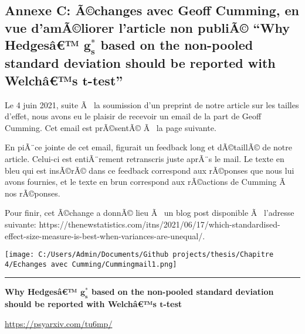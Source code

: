 \begin{appendix}
\newpage

\hypertarget{annexe-c-uxe3changes-avec-geoff-cumming-en-vue-damuxe3liorer-larticle-non-publiuxe3-why-hedgesuxe2-bmg_s-based-on-the-non-pooled-standard-deviation-should-be-reported-with-welchuxe2s-bmt-test}{%
\subsection{\texorpdfstring{Annexe C: Ã©changes avec Geoff Cumming, en
vue d'amÃ©liorer l'article non publiÃ© ``Why Hedgesâ€™ \(\bm{g_s^*}\)
based on the non-pooled standard deviation should be reported with
Welchâ€™s
\(\bm{t}\)-test''}{Annexe C: Ã©changes avec Geoff Cumming, en vue d'amÃ©liorer l'article non publiÃ© ``Why Hedgesâ€™ \textbackslash bm\{g\_s\^{}*\} based on the non-pooled standard deviation should be reported with Welchâ€™s \textbackslash bm\{t\}-test''}}\label{annexe-c-uxe3changes-avec-geoff-cumming-en-vue-damuxe3liorer-larticle-non-publiuxe3-why-hedgesuxe2-bmg_s-based-on-the-non-pooled-standard-deviation-should-be-reported-with-welchuxe2s-bmt-test}}

Le 4 juin 2021, suite Ã~ la soumission d'un preprint de notre article
sur les tailles d'effet, nous avons eu le plaisir de recevoir un email
de la part de Geoff Cumming. Cet email est prÃ©sentÃ© Ã~ la page
suivante.

En piÃ¨ce jointe de cet email, figurait un feedback long et dÃ©taillÃ©
de notre article. Celui-ci est entiÃ¨rement retranscris juste aprÃ¨s le
mail. Le texte en bleu qui est insÃ©rÃ© dans ce feedback correspond aux
rÃ©ponses que nous lui avons fournies, et le texte en brun correspond
aux rÃ©actions de Cumming Ã~ nos rÃ©ponses.

Pour finir, cet Ã©change a donnÃ© lieu Ã~ un blog post disponible Ã~
l'adresse suivante:
https://thenewstatistics.com/itns/2021/06/17/which-standardised-effect-size-measure-is-best-when-variances-are-unequal/.

\texttt{[image: C:/Users/Admin/Documents/Github projects/thesis/Chapitre 4/Echanges avec Cumming/Cummingmail1.png]}
\newpage

\begin{center}\rule{0.5\linewidth}{0.5pt}\end{center}

\textbf{Why Hedgesâ€™ \(\bm{g_s^*}\) based on the non-pooled standard
deviation should be reported with Welchâ€™s \(\bm{t}\)-test}

\underline{https://psyarxiv.com/tu6mp/}


\end{appendix}
